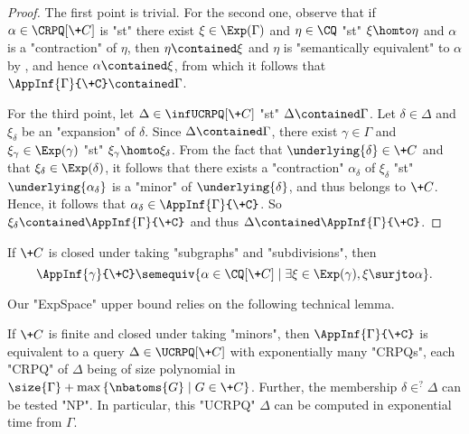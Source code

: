 \begin{proof}
	The first point is trivial. For the second one, observe that
	if $\alpha \in \CRPQ[\+C]$ is "st" there exist $\xi \in \Exp(\Gamma)$ and
	$\eta \in \CQ$ "st" $\xi \homto \eta$ and $\alpha$ is a "contraction" of $\eta$,
	then $\eta \contained \xi$ and $\eta$ is "semantically equivalent" to $\alpha$ by , and hence $\alpha \contained \xi$, from which it follows that $\AppInf{\Gamma}{\+C} \contained \Gamma$.

	For the third point, let $\Delta \in \infUCRPQ[\+C]$ "st" $\Delta \contained \Gamma$. Let $\delta \in \Delta$ and $\xi_{\delta}$ be an "expansion" of $\delta$. Since $\Delta \contained \Gamma$, there exist $\gamma \in \Gamma$ and $\xi_{\gamma} \in \Exp(\gamma)$ "st" $\xi_{\gamma} \homto \xi_{\delta}$. From the fact that $\underlying{\delta} \in \+C$ and that $\xi_{\delta} \in \Exp(\delta)$, it follows that there exists a "contraction" $\alpha_{\delta}$ of $\xi_{\delta}$ "st" $\underlying{\alpha_{\delta}}$ is a "minor" of $\underlying{\delta}$, and thus belongs to $\+C$.
	Hence, it follows that $\alpha_{\delta} \in \AppInf{\Gamma}{\+C}$.
	So $\xi_{\delta} \contained \AppInf{\Gamma}{\+C}$ and thus
	$\Delta \contained \AppInf{\Gamma}{\+C}$.
\end{proof}

\begin{remark}
	If $\+C$ is closed under taking "subgraphs" and "subdivisions", then
	\[\AppInf{\gamma}{\+C} \semequiv \{
		\alpha \in \CQ[\+C] \mid \exists \xi \in \Exp(\gamma), 
		\xi \surjto \alpha
	\}.\]
\end{remark}

Our "ExpSpace" upper bound relies on the following technical lemma.

\begin{lemma}
	\AP\label{lemma:approximation-for-finclass}
	If $\+C$ is finite and closed under taking "minors", then $\AppInf{\Gamma}{\+C}$ is equivalent to a query $\Delta\in \UCRPQ[\+C]$ with exponentially many "CRPQs", each "CRPQ" of $\Delta$ being of size polynomial in $\size{\Gamma} + \max{\set{\nbatoms{G} \mid G \in \+C}}$.
	Further, the membership $\delta \in^? \Delta$ can be tested "NP". 
	In particular, this "UCRPQ" $\Delta$ can be computed in exponential time from $\Gamma$.
\end{lemma}

